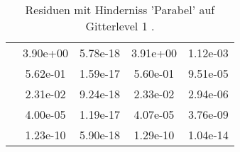 \begin{table}
\begin{tabular}{c|cc|cc|}
\multicolumn{1}{|c|}{} & \multicolumn{1}{|c|}{  3.90e+00} & \multicolumn{1}{|c|}{  5.78e-18} & \multicolumn{1}{|c|}{  3.91e+00} & \multicolumn{1}{|c|}{  1.12e-03} \\ 
\multicolumn{1}{|c|}{} & \multicolumn{1}{|c|}{  5.62e-01} & \multicolumn{1}{|c|}{  1.59e-17} & \multicolumn{1}{|c|}{  5.60e-01} & \multicolumn{1}{|c|}{  9.51e-05} \\ 
\multicolumn{1}{|c|}{} & \multicolumn{1}{|c|}{  2.31e-02} & \multicolumn{1}{|c|}{  9.24e-18} & \multicolumn{1}{|c|}{  2.33e-02} & \multicolumn{1}{|c|}{  2.94e-06} \\ 
\multicolumn{1}{|c|}{} & \multicolumn{1}{|c|}{  4.00e-05} & \multicolumn{1}{|c|}{  1.19e-17} & \multicolumn{1}{|c|}{  4.07e-05} & \multicolumn{1}{|c|}{  3.76e-09} \\ 
\multicolumn{1}{|c|}{} & \multicolumn{1}{|c|}{  1.23e-10} & \multicolumn{1}{|c|}{  5.90e-18} & \multicolumn{1}{|c|}{  1.29e-10} & \multicolumn{1}{|c|}{  1.04e-14} \\ 
\hline 
\end{tabular}\caption{Residuen mit Hinderniss 'Parabel' auf Gitterlevel 1 .}\label{tab:Residuum_Parabel_level1}
\end{table} 

